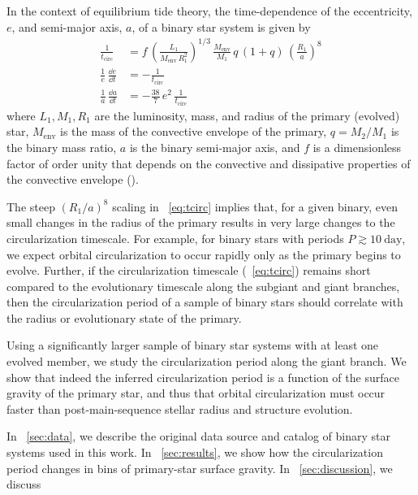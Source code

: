 \documentclass[modern, letterpaper]{aastex62}
\begin{document}
In the context of equilibrium tide theory, the time-dependence of the
eccentricity, $e$, and semi-major axis, $a$, of a binary star system is given by
\begin{align}
    \frac{1}{t_\textrm{circ}} &= f \,
        \left(\frac{L_1}{M_{\textrm{env}} \, R_1^2}\right)^{1/3} \,
        \frac{M_{\textrm{env}}}{M_1} \,
        q \, (1 + q) \,
        \left(\frac{R_1}{a}\right)^8 \label{eq:tcirc}\\
    \frac{1}{e} \, \frac{\dd e}{\dd t} &= - \frac{1}{t_\textrm{circ}}
        \label{eq:dlne} \\
    \frac{1}{a} \, \frac{\dd a}{\dd t} &= - \frac{38}{7} \, e^2 \,
        \frac{1}{t_\textrm{circ}} \label{eq:dlna}
\end{align}
where $L_1, M_1, R_1$ are the luminosity, mass, and radius of the primary
(evolved) star, $M_{\textrm{env}}$ is the mass of the convective envelope of the
primary, $q = M_2 / M_1$ is the binary mass ratio, $a$ is the binary semi-major
axis, and $f$ is a dimensionless factor of order unity that depends on the
convective and dissipative properties of the convective envelope
(\citealt{Zahn:1977,Zahn:1989,Verbunt:1995}).

The steep $\left(R_1 / a\right)^8$ scaling in \eqname~\ref{eq:tcirc}
implies that, for a given binary, even small changes in the radius of the
primary results in very large changes to the circularization timescale.
For example, for binary stars with periods $P \gtrsim 10~\textrm{day}$, we
expect orbital circularization to occur rapidly only as the primary begins to
evolve.
Further, if the circularization timescale (\eqname~\ref{eq:tcirc}) remains short
compared to the evolutionary timescale along the subgiant and giant branches,
then the circularization period of a sample of binary stars should correlate
with the radius or evolutionary state of the primary.

Using a significantly larger sample of binary star systems with at least one
evolved member, we study the circularization period along the giant branch.
We show that indeed the inferred circularization period is a function of the
surface gravity of the primary star, and thus that orbital circularization must
occur faster than post-main-sequence stellar radius and structure evolution.

In \sectionname~\ref{sec:data}, we describe the original data source and catalog
of binary star systems used in this work.
In \sectionname~\ref{sec:results}, we show how the circularization period changes in bins of primary-star surface gravity.
In \sectionname~\ref{sec:discussion}, we discuss 
\end{document}
